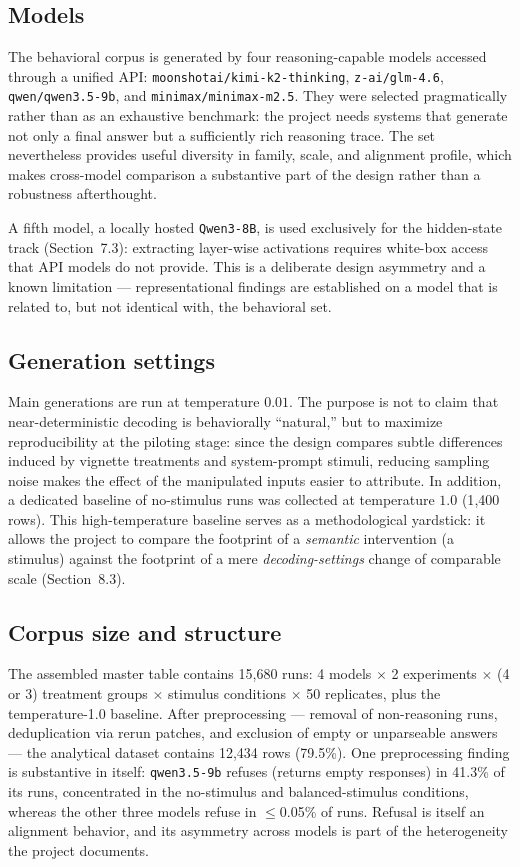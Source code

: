\documentclass[14pt,a4paper]{extarticle}
\begin{document}
\subsection{Models}

The behavioral corpus is generated by four reasoning-capable models accessed through a unified API: \texttt{moonshotai/kimi-k2-thinking}, \texttt{z-ai/glm-4.6}, \texttt{qwen/qwen3.5-9b}, and \texttt{minimax/minimax-m2.5}. They were selected pragmatically rather than as an exhaustive benchmark: the project needs systems that generate not only a final answer but a sufficiently rich reasoning trace. The set nevertheless provides useful diversity in family, scale, and alignment profile, which makes cross-model comparison a substantive part of the design rather than a robustness afterthought.

A fifth model, a locally hosted \texttt{Qwen3-8B}, is used exclusively for the hidden-state track (Section~7.3): extracting layer-wise activations requires white-box access that API models do not provide. This is a deliberate design asymmetry and a known limitation --- representational findings are established on a model that is related to, but not identical with, the behavioral set.

\subsection{Generation settings}

Main generations are run at temperature $0.01$. The purpose is not to claim that near-deterministic decoding is behaviorally ``natural,'' but to maximize reproducibility at the piloting stage: since the design compares subtle differences induced by vignette treatments and system-prompt stimuli, reducing sampling noise makes the effect of the manipulated inputs easier to attribute. In addition, a dedicated baseline of no-stimulus runs was collected at temperature $1.0$ (1{,}400 rows). This high-temperature baseline serves as a methodological yardstick: it allows the project to compare the footprint of a \emph{semantic} intervention (a stimulus) against the footprint of a mere \emph{decoding-settings} change of comparable scale (Section~8.3).

\subsection{Corpus size and structure}

The assembled master table contains 15{,}680 runs: 4 models $\times$ 2 experiments $\times$ (4 or 3) treatment groups $\times$ stimulus conditions $\times$ 50 replicates, plus the temperature-1.0 baseline. After preprocessing --- removal of non-reasoning runs, deduplication via rerun patches, and exclusion of empty or unparseable answers --- the analytical dataset contains 12{,}434 rows (79.5\%). One preprocessing finding is substantive in itself: \texttt{qwen3.5-9b} refuses (returns empty responses) in 41.3\% of its runs, concentrated in the no-stimulus and balanced-stimulus conditions, whereas the other three models refuse in $\le$0.05\% of runs. Refusal is itself an alignment behavior, and its asymmetry across models is part of the heterogeneity the project documents.
\end{document}
